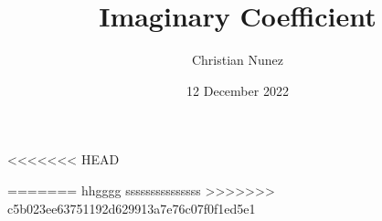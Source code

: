 \documentclass[mla8]{mla}
\title{Imaginary Coefficient}
\author{Christian Nunez}
\date{12 December 2022}
\begin{document}
<<<<<<< HEAD
\begin{paper}
\hspace{0.49 in}
=======
\hspace{0.49 in}hhgggg sssssssssssssss
>>>>>>> c5b023ee63751192d629913a7e76c07f0f1ed5e1

\end{paper}
\printbibliography
\end{document}

